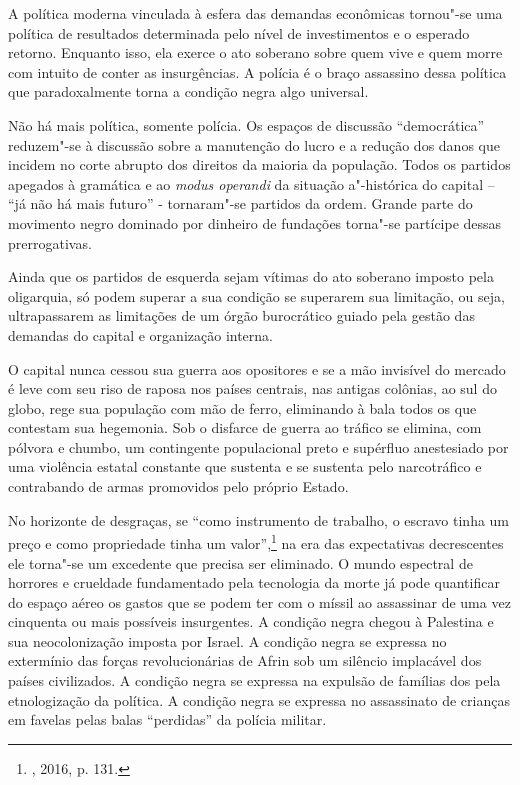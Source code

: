 A política moderna vinculada à esfera das demandas econômicas tornou"-se
uma política de resultados determinada pelo nível de investimentos e o
esperado retorno. Enquanto isso, ela exerce o ato soberano sobre quem
vive e quem morre com intuito de conter as insurgências. A polícia é o
braço assassino dessa política que paradoxalmente torna a condição negra
algo universal.

Não há mais política, somente polícia. Os espaços de discussão
``democrática'' reduzem"-se à discussão sobre a manutenção do lucro e a
redução dos danos que incidem no corte abrupto dos direitos da maioria
da população. Todos os partidos apegados à gramática e ao \emph{modus
operandi} da situação a"-histórica do capital -- ``já não há mais futuro''
- tornaram"-se partidos da ordem. Grande parte do movimento negro
dominado por dinheiro de fundações torna"-se partícipe dessas
prerrogativas.

Ainda que os partidos de esquerda sejam vítimas do ato soberano imposto
pela oligarquia, só podem superar a sua condição se superarem sua
limitação, ou seja, ultrapassarem as limitações de um órgão burocrático
guiado pela gestão das demandas do capital e organização interna.

O capital nunca cessou sua guerra aos opositores e se a mão invisível do
mercado é leve com seu riso de raposa nos países centrais, nas antigas
colônias, ao sul do globo, rege sua população com mão de ferro,
eliminando à bala todos os que contestam sua hegemonia. Sob o disfarce
de guerra ao tráfico se elimina, com pólvora e chumbo, um contingente
populacional preto e supérfluo anestesiado por uma violência estatal
constante que sustenta e se sustenta pelo narcotráfico e contrabando de
armas promovidos pelo próprio Estado.

No horizonte de desgraças, se ``como instrumento de trabalho, o escravo
tinha um preço e como propriedade tinha um valor'',\footnote{,
  2016, p. 131.} na era das expectativas decrescentes ele torna"-se um
excedente que precisa ser eliminado. O mundo espectral de horrores e
crueldade fundamentado pela tecnologia da morte já pode quantificar do
espaço aéreo os gastos que se podem ter com o míssil ao assassinar de
uma vez cinquenta ou mais possíveis insurgentes. A condição negra chegou
à Palestina e sua neocolonização imposta por Israel. A condição negra se
expressa no extermínio das forças revolucionárias de Afrin sob um
silêncio implacável dos países civilizados. A condição negra se expressa
na expulsão de famílias dos  pela etnologização da política. A
condição negra se expressa no assassinato de crianças em favelas pelas
balas ``perdidas'' da polícia militar.

